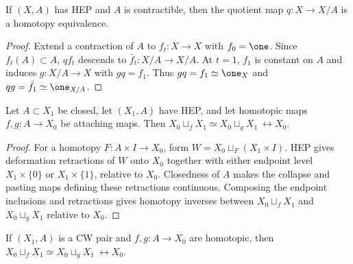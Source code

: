 \begin{proposition}
\label{prop:quotient-by-contractible-hep-homotopy-equiv}





If $(X,A)$ has HEP and $A$ is contractible, then the quotient map $q:X\to X/A$ is
a homotopy equivalence.
\end{proposition}

\begin{proof}

\sketch Extend a contraction of $A$ to $f_t:X\to X$ with $f_0=\one$. Since
$f_t(A)\subset A$, $qf_t$ descends to $\bar f_t:X/A\to X/A$. At $t=1$, $f_1$
is constant on $A$ and induces $g:X/A\to X$ with $gq=f_1$. Thus
$gq=f_1\simeq\one_X$ and $qg=\bar f_1\simeq\one_{X/A}$.
\end{proof}

\begin{lemma}
\label{lem:attach-homotopic-hep-rel}





Let $A\subset X_1$ be closed, let $(X_1,A)$ have HEP, and let homotopic maps
$f,g:A\to X_0$ be attaching maps. Then
$X_0\sqcup_fX_1\simeq X_0\sqcup_gX_1\ \rel X_0$.
\end{lemma}

\begin{proof}

\sketch For a homotopy $F:A\times I\to X_0$, form
$W=X_0\sqcup_F(X_1\times I)$. HEP gives deformation retractions of $W$ onto
$X_0$ together with either endpoint level $X_1\times\{0\}$ or
$X_1\times\{1\}$, relative to $X_0$. Closedness of $A$ makes the collapse and
pasting maps defining these retractions continuous. Composing the endpoint
inclusions and retractions gives homotopy inverses between
$X_0\sqcup_fX_1$ and $X_0\sqcup_gX_1$ relative to $X_0$.
\end{proof}

\begin{proposition}
\label{prop:attaching-maps-homotopic-rel-x0}



If $(X_1,A)$ is a CW pair and $f,g:A\to X_0$ are homotopic, then
$X_0\sqcup_fX_1\simeq X_0\sqcup_gX_1\ \rel X_0$.
\end{proposition}

